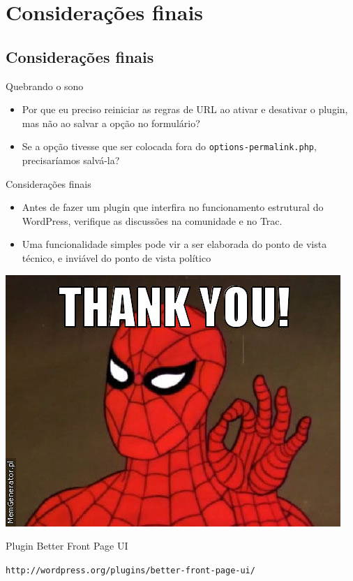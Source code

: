 \documentclass[handout]{beamer}
\begin{document}
\section{Considerações finais}
\subsection{Considerações finais}

\begin{frame}{Quebrando o sono}
\begin{itemize}
  \pause \item Por que eu preciso reiniciar as regras de URL ao
    ativar e desativar o plugin, mas não ao salvar a opção no formulário?
  \pause \item Se a opção tivesse que ser colocada fora do
    \texttt{options-permalink.php}, precisaríamos salvá-la?
\end{itemize}
\end{frame}

\begin{frame}{Considerações finais}
\begin{itemize}
  \pause \item Antes de fazer um plugin que interfira no funcionamento
    estrutural do WordPress, verifique as discussões na comunidade e no Trac.
  \pause \item Uma funcionalidade simples pode vir a ser elaborada do ponto de
    vista técnico, e inviável do ponto de vista político
\end{itemize}
\end{frame}

\begin{frame}
\begin{center}

  \includegraphics[height=0.6\textheight]{./img/thank-you.jpg}

  Plugin Better Front Page UI

  \texttt{http://wordpress.org/plugins/better-front-page-ui/}

\end{center}
\end{frame}
\end{document}
